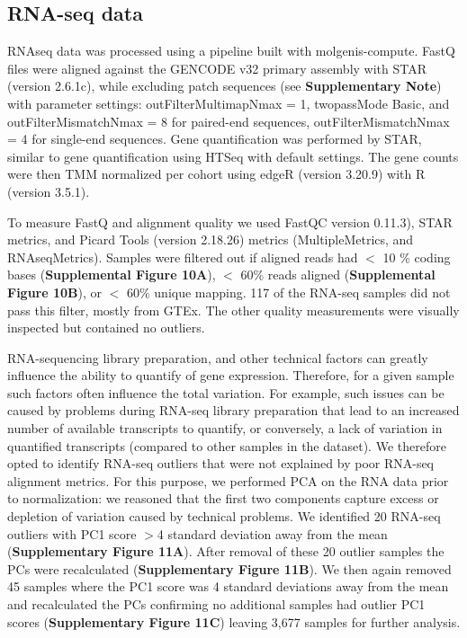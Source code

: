 \subsection{RNA-seq data}
RNAseq data was processed using a pipeline built with molgenis-compute\cite{byelasMOLGENISBasedComputational2011}. FastQ files were aligned against the GENCODE\cite{frankishGENCODEReferenceAnnotation2019} v32 primary assembly with STAR\cite{dobinSTARUltrafastUniversal2013} (version 2.6.1c), while excluding patch sequences (see \textbf{Supplementary Note}) with parameter settings: outFilterMultimapNmax = 1, twopassMode Basic, and outFilterMismatchNmax = 8 for paired-end sequences, outFilterMismatchNmax = 4 for single-end sequences. Gene quantification was performed by STAR, similar to gene quantification using HTSeq\cite{andersHTSeqPythonFramework2015} with default settings. The gene counts were then TMM\cite{robinsonScalingNormalizationMethod2010} normalized per cohort using edgeR\cite{robinsonEdgeRBioconductorPackage2010} (version 3.20.9) with R\cite{rcoreteamLanguageEnvironmentStatistical2017} (version 3.5.1). 

To measure FastQ and alignment quality we used FastQC\cite{BabrahamBioinformaticsFastQC} version 0.11.3), STAR metrics, and Picard Tools\cite{broadinstitutePicardTools2019} (version 2.18.26) metrics (MultipleMetrics, and RNAseqMetrics). Samples were filtered out if aligned reads had $<$ 10
\% coding bases (\textbf{Supplemental Figure 10A}), $<$ 60\% reads aligned (\textbf{Supplemental Figure 10B}), or $<$ 60\% unique mapping. 117 of the RNA-seq samples did not pass this filter, mostly from GTEx\cite{consortiumGTExConsortiumAtlas2020}. The other quality measurements were visually inspected but contained no outliers. 

RNA-sequencing library preparation, and other technical factors can greatly influence the ability to quantify of gene expression. Therefore, for a given sample such factors often influence the total variation. For example, such issues can be caused by problems during RNA-seq library preparation that lead to an increased number of available transcripts to quantify, or conversely, a lack of variation in quantified transcripts (compared to other samples in the dataset). We therefore opted to identify RNA-seq outliers that were not explained by poor RNA-seq alignment metrics. For this purpose, we performed PCA on the RNA data prior to normalization: we reasoned that the first two components capture excess or depletion of variation caused by technical problems. We identified 20 RNA-seq outliers with PC1 score $>$4 standard deviation away from the mean (\textbf{Supplementary Figure 11A}). After removal of these 20 outlier samples the PCs were recalculated (\textbf{Supplementary Figure 11B}). We then again removed 45 samples where the PC1 score was 4 standard deviations away from the mean and recalculated the PCs confirming no additional samples had outlier PC1 scores (\textbf{Supplementary Figure 11C}) leaving 3,677 samples for further analysis. 



